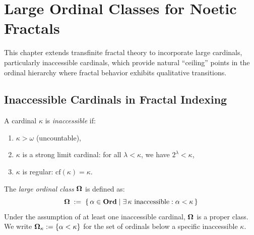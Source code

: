 

\chapter{Large Ordinal Classes for Noetic Fractals}
\label{ch:large-ordinals}

\begin{tcolorbox}[colback=blue!5!white,colframe=blue!75!black,title=\vnewfour]
This chapter extends transfinite fractal theory to incorporate large cardinals,
particularly inaccessible cardinals, which provide natural ``ceiling'' points
in the ordinal hierarchy where fractal behavior exhibits qualitative transitions.
\end{tcolorbox}

\section{Inaccessible Cardinals in Fractal Indexing}

\begin{definition}
\label{def:inaccessible}
A cardinal $\kappa$ is \emph{inaccessible} if:
\begin{enumerate}[label=(\alph*)]
    \item $\kappa > \omega$ (uncountable),
    \item $\kappa$ is a strong limit cardinal: for all $\lambda < \kappa$,
          we have $2^\lambda < \kappa$,
    \item $\kappa$ is regular: $\mathrm{cf}(\kappa) = \kappa$.
\end{enumerate}
\end{definition}

\begin{definition}
\label{def:large-ord}
The \emph{large ordinal class} $\boldsymbol{\Omega}$ is defined as:
\[
    \boldsymbol{\Omega} \;:=\; \{\, \alpha \in \mathbf{Ord} \mid
    \exists\, \kappa \text{ inaccessible}: \alpha < \kappa \,\}
\]
Under the assumption of at least one inaccessible cardinal, $\boldsymbol{\Omega}$ is a
proper class. We write $\boldsymbol{\Omega}_\kappa := \{\alpha < \kappa\}$ for the set
of ordinals below a specific inaccessible $\kappa$.
\end{definition}


